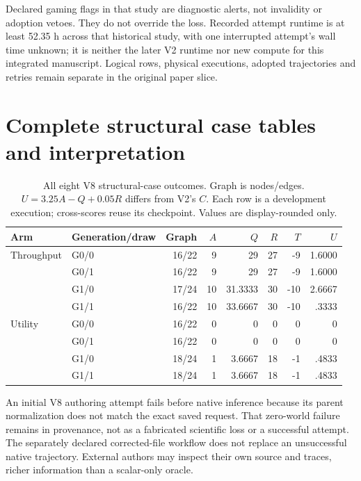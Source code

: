 Declared gaming flags in that study are diagnostic alerts, not invalidity or
adoption vetoes. They do not override the loss. Recorded attempt runtime is
at least 52.35 h across that historical study, with one interrupted attempt's
wall time unknown; it is neither the later V2 runtime nor new compute for
this integrated manuscript. Logical rows, physical executions, adopted
trajectories and retries remain separate in the original paper slice.

\FloatBarrier
\section{Complete structural case tables and interpretation}
\label{app:structural}
\begin{table}[h]\centering\small
\caption{All eight V8 structural-case outcomes. Graph is nodes/edges.
$U=3.25A-Q+0.05R$ differs from V2's $C$. Each row is a development execution;
cross-scores reuse its checkpoint. Values are display-rounded only.}
\label{tab:integrated-v8-all}
\begin{tabular}{llrrrrrr}\toprule
Arm & Generation/draw & Graph & $A$ & $Q$ & $R$ & $T$ & $U$\\\midrule
Throughput&G0/0&16/22&9&29&27&-9&1.6000\\
&G0/1&16/22&9&29&27&-9&1.6000\\
&G1/0&17/24&10&31.3333&30&-10&2.6667\\
&G1/1&16/22&10&33.6667&30&-10&.3333\\\addlinespace
Utility&G0/0&16/22&0&0&0&0&0\\
&G0/1&16/22&0&0&0&0&0\\
&G1/0&18/24&1&3.6667&18&-1&.4833\\
&G1/1&18/24&1&3.6667&18&-1&.4833\\\bottomrule
\end{tabular}\end{table}

An initial V8 authoring attempt fails before native inference because its
parent normalization does not match the exact saved request. That zero-world
failure remains in provenance, not as a fabricated scientific loss or a
successful attempt. The separately declared corrected-file workflow does not
replace an unsuccessful native trajectory. External authors may inspect their
own source and traces, richer information than a scalar-only oracle.


